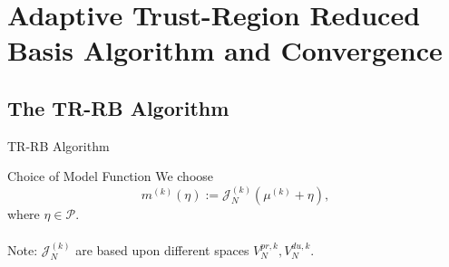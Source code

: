 \section{Adaptive Trust-Region Reduced Basis Algorithm and Convergence}

\subsection{The TR-RB Algorithm}

\begin{frame}{TR-RB Algorithm}
    \begin{block}{Choice of Model Function}
        We choose
        \begin{equation*}
            m^{(k)}(\eta) := \mathcal{J}_N^{(k)}(\mu^{(k)} + \eta),
        \end{equation*}
        where $\eta \in \mathcal{P}$. \\~\\

        Note: $\mathcal{J}_N^{(k)}$ are based upon different spaces $V_N^{pr, k}, V_N^{du, k}$.
    \end{block}
\end{frame}

